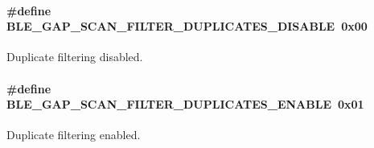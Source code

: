 \paragraph[{\texorpdfstring{B\+L\+E\+\_\+\+G\+A\+P\+\_\+\+S\+C\+A\+N\+\_\+\+F\+I\+L\+T\+E\+R\+\_\+\+D\+U\+P\+L\+I\+C\+A\+T\+E\+S\+\_\+\+D\+I\+S\+A\+B\+LE}{BLE_GAP_SCAN_FILTER_DUPLICATES_DISABLE}}]{\setlength{\rightskip}{0pt plus 5cm}\#define B\+L\+E\+\_\+\+G\+A\+P\+\_\+\+S\+C\+A\+N\+\_\+\+F\+I\+L\+T\+E\+R\+\_\+\+D\+U\+P\+L\+I\+C\+A\+T\+E\+S\+\_\+\+D\+I\+S\+A\+B\+LE~0x00}\hypertarget{group___b_l_e___g_a_p___s_c_a_n___f_i_l_t_e_r___p_o_l_i_c_y_gae83f7cdd783e6a248a02a9664a0aae13}{}\label{group___b_l_e___g_a_p___s_c_a_n___f_i_l_t_e_r___p_o_l_i_c_y_gae83f7cdd783e6a248a02a9664a0aae13}
Duplicate filtering disabled. 
\paragraph[{\texorpdfstring{B\+L\+E\+\_\+\+G\+A\+P\+\_\+\+S\+C\+A\+N\+\_\+\+F\+I\+L\+T\+E\+R\+\_\+\+D\+U\+P\+L\+I\+C\+A\+T\+E\+S\+\_\+\+E\+N\+A\+B\+LE}{BLE_GAP_SCAN_FILTER_DUPLICATES_ENABLE}}]{\setlength{\rightskip}{0pt plus 5cm}\#define B\+L\+E\+\_\+\+G\+A\+P\+\_\+\+S\+C\+A\+N\+\_\+\+F\+I\+L\+T\+E\+R\+\_\+\+D\+U\+P\+L\+I\+C\+A\+T\+E\+S\+\_\+\+E\+N\+A\+B\+LE~0x01}\hypertarget{group___b_l_e___g_a_p___s_c_a_n___f_i_l_t_e_r___p_o_l_i_c_y_ga193a4ac4903b4459445528918972df0b}{}\label{group___b_l_e___g_a_p___s_c_a_n___f_i_l_t_e_r___p_o_l_i_c_y_ga193a4ac4903b4459445528918972df0b}
Duplicate filtering enabled. 